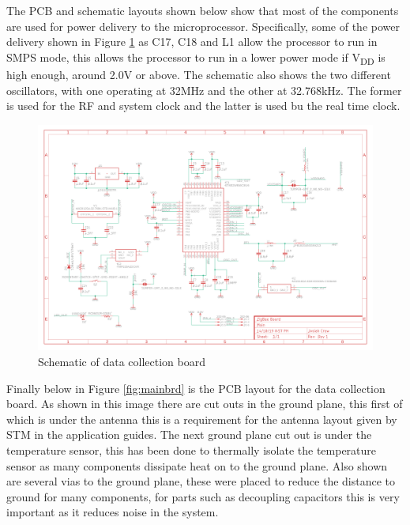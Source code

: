 \documentclass[12pt]{article}
\begin{document}
The PCB and schematic layouts shown below show that most of the components are used for power
delivery to the microprocessor. Specifically, some of the power delivery shown in Figure
{\ref{fig:mainsch}} as C17, C18 and L1 allow the processor to run in SMPS mode, this allows the
processor to run in a lower power mode if V\textsubscript{DD} is high enough, around 2.0V or
above. The schematic also shows the two different oscillators, with one operating at 32MHz and the
other at 32.768kHz. The former is used for the RF and system clock and the latter is used bu the
real time clock.

\begin{figure}[H]
\includegraphics[width=\textwidth]{main-sch}
\caption{Schematic of data collection board}
\label{fig:mainsch}
\end{figure}

Finally below in Figure {\ref{fig:mainbrd}} is the PCB layout for the data collection board. As
shown in this image there are cut outs in the ground plane, this first of which is under the
antenna this is a requirement for the antenna layout given by STM in the application guides. The
next ground plane cut out is under the temperature sensor, this has been done to thermally isolate
the temperature sensor as many components dissipate heat on to the ground plane. Also shown are
several vias to the ground plane, these were placed to reduce the distance to ground for many
components, for parts such as decoupling capacitors this is very important as it reduces noise in
the system.
\end{document}
